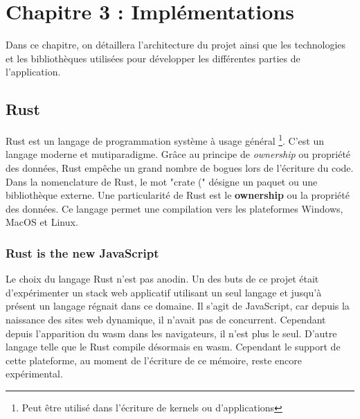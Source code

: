 \chapter{Chapitre 3 : Implémentations}

Dans ce chapitre, on détaillera l'architecture du projet 
ainsi que les technologies et les bibliothèques utilisées
pour développer les différentes parties de l'application.


\section{Rust}

Rust est un langage de programmation système à usage général \footnote{Peut être
utilisé dans l'écriture de kernels ou d'applications}. C'est un langage moderne
et mutiparadigme.
Grâce au principe de \textit{ownership} ou propriété des données, Rust empêche un grand nombre de
bogues lors de l'écriture du code. 
Dans la nomenclature de Rust, le mot "crate (" désigne un paquet ou une bibliothèque
externe.
Une particularité de Rust est le \textbf{ownership} ou la propriété des données.
Ce langage permet une compilation vers les plateformes Windows, MacOS et Linux.

\subsection{Rust is the new JavaScript} 

Le choix du langage Rust n'est pas anodin.
Un des buts de ce projet était d'expérimenter un stack
web applicatif utilisant un seul langage et jusqu'à présent un langage régnait dans ce domaine.
Il s'agit de JavaScript, car depuis la naissance des sites web dynamique, il
n'avait pas de concurrent.
Cependant depuis l'apparition du \gls{wasm} dans les navigateurs, il n'est plus
le seul. D'autre langage telle que le Rust compile désormais en \gls{wasm}.
Cependant le support de cette plateforme, au moment de l'écriture de ce mémoire,
reste encore expérimental.

